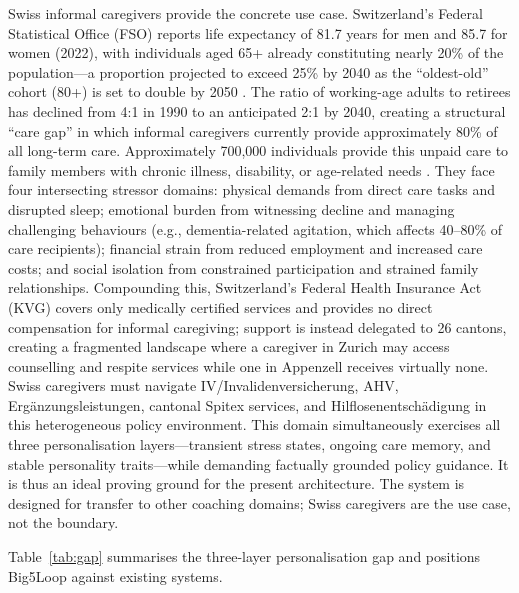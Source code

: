 \documentclass[10pt,a4paper]{report}
\begin{document}
Swiss informal caregivers provide the concrete use case. Switzerland's Federal Statistical Office (FSO) reports life expectancy of 81.7 years for men and 85.7 for women (2022), with individuals aged 65+ already constituting nearly 20\% of the population---a proportion projected to exceed 25\% by 2040 as the ``oldest-old'' cohort (80+) is set to double by 2050 \citep{FSO2023}. The ratio of working-age adults to retirees has declined from 4:1 in 1990 to an anticipated 2:1 by 2040, creating a structural ``care gap'' in which informal caregivers currently provide approximately 80\% of all long-term care. Approximately 700,000 individuals provide this unpaid care to family members with chronic illness, disability, or age-related needs \citep{OECD2023, ZHAW2022}. They face four intersecting stressor domains: physical demands from direct care tasks and disrupted sleep; emotional burden from witnessing decline and managing challenging behaviours (e.g., dementia-related agitation, which affects 40--80\% of care recipients); financial strain from reduced employment and increased care costs; and social isolation from constrained participation and strained family relationships. Compounding this, Switzerland's Federal Health Insurance Act (KVG) covers only medically certified services and provides no direct compensation for informal caregiving; support is instead delegated to 26 cantons, creating a fragmented landscape where a caregiver in Zurich may access counselling and respite services while one in Appenzell receives virtually none. Swiss caregivers must navigate IV/Invalidenversicherung, AHV, Ergänzungsleistungen, cantonal Spitex services, and Hilflosenentschädigung in this heterogeneous policy environment. This domain simultaneously exercises all three personalisation layers---transient stress states, ongoing care memory, and stable personality traits---while demanding factually grounded policy guidance. It is thus an ideal proving ground for the present architecture. The system is designed for transfer to other coaching domains; Swiss caregivers are the use case, not the boundary.

Table~\ref{tab:gap} summarises the three-layer personalisation gap and positions Big5Loop against existing systems.
\end{document}
